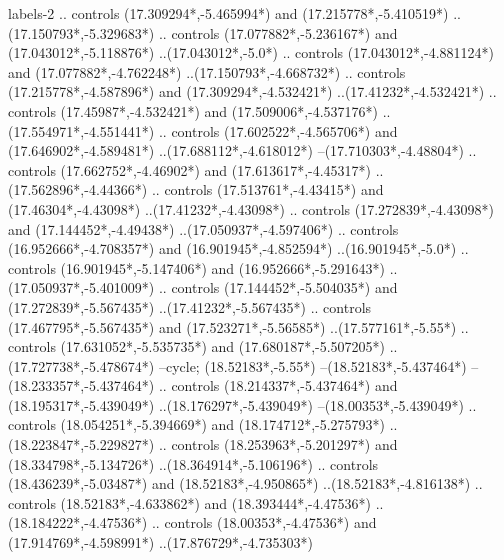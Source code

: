 {\begin{scope}[x=1mm,y=1mm,line width=\SCstroke mm,line cap=round,line join=round]
\begin{SCpart}{labels-2}
.. controls ({17.309294*\SCF},{-5.465994*\SCF}) and ({17.215778*\SCF},{-5.410519*\SCF}) ..({17.150793*\SCF},{-5.329683*\SCF})
.. controls ({17.077882*\SCF},{-5.236167*\SCF}) and ({17.043012*\SCF},{-5.118876*\SCF}) ..({17.043012*\SCF},{-5.0*\SCF})
.. controls ({17.043012*\SCF},{-4.881124*\SCF}) and ({17.077882*\SCF},{-4.762248*\SCF}) ..({17.150793*\SCF},{-4.668732*\SCF})
.. controls ({17.215778*\SCF},{-4.587896*\SCF}) and ({17.309294*\SCF},{-4.532421*\SCF}) ..({17.41232*\SCF},{-4.532421*\SCF})
.. controls ({17.45987*\SCF},{-4.532421*\SCF}) and ({17.509006*\SCF},{-4.537176*\SCF}) ..({17.554971*\SCF},{-4.551441*\SCF})
.. controls ({17.602522*\SCF},{-4.565706*\SCF}) and ({17.646902*\SCF},{-4.589481*\SCF}) ..({17.688112*\SCF},{-4.618012*\SCF})
--({17.710303*\SCF},{-4.48804*\SCF})
.. controls ({17.662752*\SCF},{-4.46902*\SCF}) and ({17.613617*\SCF},{-4.45317*\SCF}) ..({17.562896*\SCF},{-4.44366*\SCF})
.. controls ({17.513761*\SCF},{-4.43415*\SCF}) and ({17.46304*\SCF},{-4.43098*\SCF}) ..({17.41232*\SCF},{-4.43098*\SCF})
.. controls ({17.272839*\SCF},{-4.43098*\SCF}) and ({17.144452*\SCF},{-4.49438*\SCF}) ..({17.050937*\SCF},{-4.597406*\SCF})
.. controls ({16.952666*\SCF},{-4.708357*\SCF}) and ({16.901945*\SCF},{-4.852594*\SCF}) ..({16.901945*\SCF},{-5.0*\SCF})
.. controls ({16.901945*\SCF},{-5.147406*\SCF}) and ({16.952666*\SCF},{-5.291643*\SCF}) ..({17.050937*\SCF},{-5.401009*\SCF})
.. controls ({17.144452*\SCF},{-5.504035*\SCF}) and ({17.272839*\SCF},{-5.567435*\SCF}) ..({17.41232*\SCF},{-5.567435*\SCF})
.. controls ({17.467795*\SCF},{-5.567435*\SCF}) and ({17.523271*\SCF},{-5.56585*\SCF}) ..({17.577161*\SCF},{-5.55*\SCF})
.. controls ({17.631052*\SCF},{-5.535735*\SCF}) and ({17.680187*\SCF},{-5.507205*\SCF}) ..({17.727738*\SCF},{-5.478674*\SCF})
--cycle;
 ({18.52183*\SCF},{-5.55*\SCF})
--({18.52183*\SCF},{-5.437464*\SCF})
--({18.233357*\SCF},{-5.437464*\SCF})
.. controls ({18.214337*\SCF},{-5.437464*\SCF}) and ({18.195317*\SCF},{-5.439049*\SCF}) ..({18.176297*\SCF},{-5.439049*\SCF})
--({18.00353*\SCF},{-5.439049*\SCF})
.. controls ({18.054251*\SCF},{-5.394669*\SCF}) and ({18.174712*\SCF},{-5.275793*\SCF}) ..({18.223847*\SCF},{-5.229827*\SCF})
.. controls ({18.253963*\SCF},{-5.201297*\SCF}) and ({18.334798*\SCF},{-5.134726*\SCF}) ..({18.364914*\SCF},{-5.106196*\SCF})
.. controls ({18.436239*\SCF},{-5.03487*\SCF}) and ({18.52183*\SCF},{-4.950865*\SCF}) ..({18.52183*\SCF},{-4.816138*\SCF})
.. controls ({18.52183*\SCF},{-4.633862*\SCF}) and ({18.393444*\SCF},{-4.47536*\SCF}) ..({18.184222*\SCF},{-4.47536*\SCF})
.. controls ({18.00353*\SCF},{-4.47536*\SCF}) and ({17.914769*\SCF},{-4.598991*\SCF}) ..({17.876729*\SCF},{-4.735303*\SCF})

\end{SCpart}
\end{scope}}
